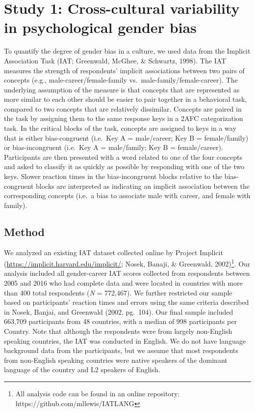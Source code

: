 \documentclass[10pt, letterpaper]{article}
\begin{document}
\section{Study 1: Cross-cultural variability in psychological gender
bias}\label{study-1-cross-cultural-variability-in-psychological-gender-bias}

To quantify the degree of gender bias in a culture, we used data from
the Implicit Association Task (IAT; Greenwald, McGhee, \& Schwartz,
1998). The IAT measures the strength of respondents' implicit
associations between two pairs of concepts (e.g.,
male-career/female-family vs.~male-family/female-career). The underlying
assumption of the measure is that concepts that are represented as more
similar to each other should be easier to pair together in a behavioral
task, compared to two concepts that are relatively dissimilar. Concepts
are paired in the task by assigning them to the same response keys in a
2AFC categorization task. In the critical blocks of the task, concepts
are assigned to keys in a way that is either bias-congruent (i.e.~Key A
= male/career; Key B = female/family) or bias-incongruent (i.e.~Key A =
male/family; Key B = female/career). Participants are then presented
with a word related to one of the four concepts and asked to classify it
as quickly as possible by responding with one of the two keys. Slower
reaction times in the bias-incongruent blocks relative to the
bias-congruent blocks are interpreted as indicating an implicit
association between the corresponding concepts (i.e.~a bias to associate
male with career, and female with family).

\subsection{Method}\label{method}

We analyzed an existing IAT dataset collected online by Project Implicit
(\url{https://implicit.harvard.edu/implicit/}; Nosek, Banaji, \&
Greenwald,
2002)\footnote{All analysis code can be found in an online repository: https://github.com/mllewis/IATLANG}.
Our analysis included all gender-career IAT scores collected from
respondents between 2005 and 2016 who had complete data and were located
in countries with more than 400 total respondents (\emph{N} = 772,467).
We further restricted our sample based on participants' reaction times
and errors using the same criteria described in Nosek, Banjai, and
Greenwald (2002, pg.~104). Our final sample included 663,709
participants from 48 countries, with a median of 998 participants per
Country. Note that although the respondents were from largely
non-English speaking countries, the IAT was conducted in English. We do
not have language background data from the participants, but we assume
that most respondents from non-English speaking countries were native
speakers of the dominant language of the country and L2 speakers of
English.
\end{document}
